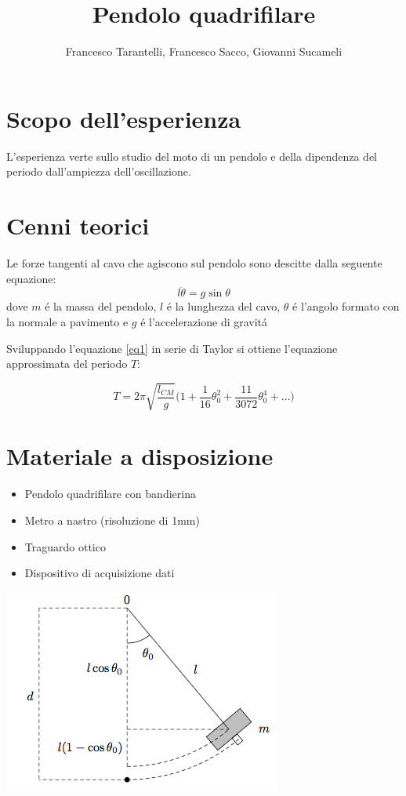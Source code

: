 \documentclass{article}
\author{Francesco Tarantelli, Francesco Sacco, Giovanni Sucameli}
\begin{document}
\title{Pendolo quadrifilare}
\maketitle
\section{Scopo dell'esperienza}
L'esperienza verte sullo studio del moto di un pendolo e della dipendenza del periodo dall'ampiezza dell'oscillazione.
\section{Cenni teorici}
Le forze tangenti al cavo che agiscono sul pendolo sono descitte dalla seguente equazione:
\begin{equation}
\label{eq1}
l\ddot{\theta}=g\sin\theta 
\end{equation}
dove $m$ \'e la massa del pendolo, $l$ \'e la lunghezza del cavo, $\theta$ \'e l'angolo formato con la normale a pavimento e $g$ \'e l'accelerazione di gravit\'a\par
Sviluppando l'equazione \ref{eq1} in serie di Taylor si ottiene l'equazione approssimata del periodo $T$:

\begin{equation}
\label{eq2}
T=2\pi\sqrt{\frac{l_{CM}}{g}}\bigg(1+\frac{1}{16}\theta_{0}^2+\frac{11}{3072}\theta_{0}^4+\dots\bigg)
\end{equation}

\section{Materiale a disposizione}

\begin{itemize}
\item Pendolo quadrifilare con bandierina
\item Metro a nastro (risoluzione di 1mm)
\item Traguardo ottico
\item Dispositivo di acquisizione dati
\end{itemize}

\includegraphics[scale=0.5]{schema_pendolo}
\end{document}
